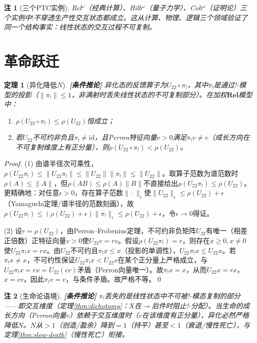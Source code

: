 \documentclass[11pt,a4paper]{article}
\newtheorem{theorem}{定理}
\newtheorem{remark}{注}
\newcommand{\lvl}[1]{\hfill\textbf{\footnotesize[#1]}}
\newcommand{\lvC}{\lvl{条件推论}}
\newcommand{\lolli}{\multimap}
\newcommand{\bang}{{!}}
\begin{document}
\begin{remark}[三个PTC实例]
Rel$^\omega$（经典计算）、Hilb$^\omega$（量子力学）、Coh$^\omega$（证明论）三个实例中$\bang$不穿透生产性交互状态都成立。这从计算、物理、逻辑三个领域验证了同一个结构事实：线性状态的交互过程不可复制。
\end{remark}

\section{革命跃迁}

\begin{theorem}[异化降低$N$]\label{thm:alienation-lowers-n}\lvC
异化态的反馈算子为$U_{22}\circ\pi_!$，其中$\pi_!$是通过!-模型的投影（$\|\pi_!\|\leq1$，非满射时丢失线性状态的不可复制部分）。在加权$\mathbf{Rel}$模型中：
\begin{enumerate}
  \item $\rho(U_{22}\circ\pi_!)\leq\rho(U_{22})$恒成立；
  \item 若$U_{22}$不可约非负且$\pi_!\neq\mathrm{id}$，且Perron特征向量$v>0$满足$\pi_!v\neq v$（成长方向在不可复制维度上有正分量），则$\rho(U_{22}\circ\pi_!)<\rho(U_{22})$。
\end{enumerate}
\end{theorem}

\begin{proof}
(1) 由谱半径次可乘性，$\rho(U_{22}\pi_!)\leq\|U_{22}\pi_!\|\leq\|U_{22}\|\|\pi_!\|\leq\|U_{22}\|$。取算子范数为谱范数时$\rho(A)\leq\|A\|$，但$\rho(AB)\leq\rho(A)\|B\|$不直接给出$\rho(U_{22}\pi_!)\leq\rho(U_{22})$。更精确地：对任意$\epsilon>0$，存在算子范数$\|\cdot\|_\epsilon$使$\|U_{22}\|_\epsilon\leq\rho(U_{22})+\epsilon$（Yamaguchi定理/谱半径的范数刻画），故$\rho(U_{22}\pi_!)\leq(\rho(U_{22})+\epsilon)\|\pi_!\|_\epsilon\leq\rho(U_{22})+\epsilon$，令$\epsilon\to0$得证。

(2) 设$r=\rho(U_{22})$，由Perron--Frobenius定理，不可约非负矩阵$U_{22}$有唯一（相差正倍数）正特征向量$v>0$使$U_{22}v=rv$。假设$\rho(U_{22}\pi_!)=r$，则存在$x\geq0,x\neq0$使$U_{22}\pi_!x=rx$。由$U_{22}$不可约且$\pi_!x\leq x$（投影的单调性），$U_{22}\pi_!x\leq U_{22}x$。若$\pi_!x\neq x$，不可约性保证$U_{22}\pi_!x<U_{22}x$在某个正分量上严格成立，与$U_{22}\pi_!x=rx=U_{22}(cv)$矛盾（Perron向量唯一）。故$\pi_!x=x$，从而$U_{22}x=rx$，$x=cv$，因此$\pi_!v=v$，与条件矛盾。故严格不等。\qed
\end{proof}

\begin{remark}[生命论语境]\lvC
$\pi_!$丢失的是线性状态中不可被!-模态复制的部分——即交互维度（定理\ref{thm:dichotomy}：$X$在$\lolli$后件时阻止!-分配）。当生命的成长方向（Perron向量$v$）依赖于交互维度时（$v$在该维度有正分量），异化必然严格降低$N$。$N$从$>1$（创造/盈余）降到$=1$（持平）甚至$<1$（衰退/慢性死亡），与定理\ref{thm:slow-death}（慢性死亡）衔接。
\end{remark}
\end{document}
